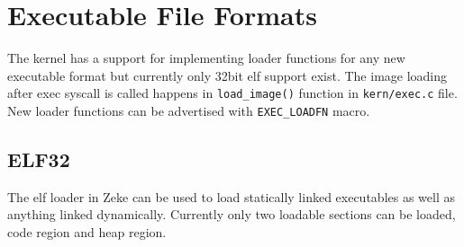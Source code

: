 \part{Executable File Formats}

The kernel has a support for implementing loader functions for any new
executable format but currently only 32bit \acf{elf} support exist. The image
loading after exec syscall is called happens in \verb+load_image()+ function in
\verb+kern/exec.c+ file. New loader functions can be advertised with
\verb+EXEC_LOADFN+ macro.

\chapter{ELF32}

The \acs{elf} loader in Zeke can be used to load statically linked executables
as well as anything linked dynamically. Currently only two loadable sections can
be loaded, code region and heap region.
